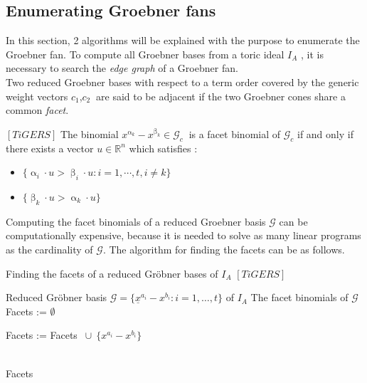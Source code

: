 

\subsection{Enumerating Groebner fans}
\label{subsec:enumerate}

In this section, 2 algorithms will be explained with the  purpose to enumerate the Groebner fan.
To compute all Groebner bases from a toric ideal $I_A$ , it is necessary to search the \textit{edge graph} of a Groebner fan.\\
Two reduced Groebner bases with respect to a term order covered by the generic weight vectors $c_{1}$,$c_{2}~$ are said to be adjacent if the two Groebner cones share a common \textit{facet}.

\begin{env_definition}
$\left[TiGERS \right]  $ 
The binomial $x^{\upalpha_{k}}-x^{\upbeta_k} \in \mathcal{G}_c~$ is a facet binomial of $\mathcal{G}_c$ if and only if there exists a vector $u \in \mathbb{R}^{n}$ which satisfies :

\begin{itemize}
\item
$ \lbrace \upalpha_{i} \cdot u > \upbeta_{i} \cdot u : i = 1, \cdots , t, i \neq k \rbrace  
$
\item
$ \lbrace \upbeta_{k} \cdot u > \upalpha_{k} \cdot u \rbrace $
\end{itemize}


\end{env_definition}
Computing the facet binomials of a reduced Groebner basis $\mathcal{G}$ can be computationally expensive, because it is needed to solve as many linear programs as the cardinality of $\mathcal{G}$. The algorithm for finding the facets can be as follows.



\begin{algorithm}
\caption{Finding the facets of a reduced Gröbner bases of $I_A$ $\left[ TiGERS\right]  $}
\label{alg:facetsLP}
\begin{algorithmic}[1]

\Require
Reduced Gröbner basis $ \mathcal{G} = \lbrace \underline{x}^{a_{i}} - {x}^{b_{i}} : i = 1,\dots,t  \rbrace $ of $I_A$
\Ensure The facet binomials of $\mathcal{G}$
\State Facets := $\emptyset$

\State Facets := Facets $~\cup~\{{x}^{a_{i}} - {x}^{b_{i}} \} $
\EndIf

\EndFor \\
\Return Facets
\end{algorithmic}
\end{algorithm}

